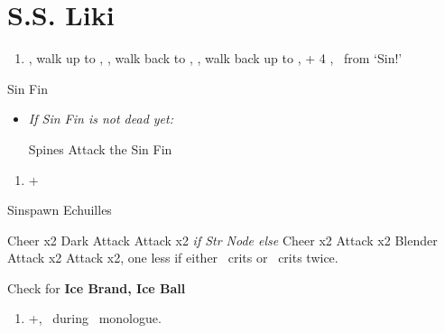 \chapter{S.S. Liki}

\begin{enumerate}
	\item \cs[2:00], walk up to \yuna, \sd, walk back to \wakka, \sd, walk back up to \yuna, \cs + 4 \skippablefmv[4:20], \sd\ from `Sin!'
\end{enumerate}
\begin{battle}[2000]{Sin Fin}
    \begin{itemize}
        \tidusf Defend
        \switch{\yuna}{\lulu}
        \luluf Thunder the Sin Fin
        \switch{\kimahri}{\yuna}
        \summon{\valefor}
        \valeforf Energy Ray \od\ on Sin Fin
        \enemyf Move x2 and Spines x2
        \valeforf Thunder the Sin Fin
        \enemyf Spines and Move
        \valeforf Thunder the Sin Fin x2
        \item \textit{If Sin Fin is not dead yet:}
            \begin{itemize}
                \enemyf Spines
                \switch{\tidus}{\wakka}
				\wakkaf Attack the Sin Fin
            \end{itemize}
    \end{itemize}
\end{battle}
\begin{enumerate}[resume]
	\item \fmv+\cs[1:40]
\end{enumerate}
\begin{battle}[2000]{Sinspawn Echuilles}
	\begin{itemize}
		\tidusf Cheer x2
		\wakkaf Dark Attack
		\tidusf Attack x2 \textit{if Str Node else} Cheer x2
		\wakkaf Attack x2
		\enemyf Blender
		\wakkaf Attack x2
		\tidusf Attack x2, one less if either \tidus\ crits or \wakka\ crits twice.
		\tidusf \od
	\end{itemize}
	Check for \textbf{Ice Brand, Ice Ball}
\end{battle}
\begin{enumerate}[resume]
	\item \skippablefmv+\cs[1:30], \sd\ during \tidus\ monologue.
\end{enumerate}